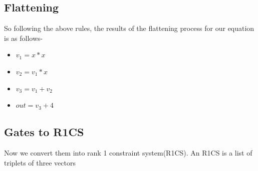 \documentclass[12pt,letterpaper]{article}
\begin{document}
\subsection{Flattening}
So following the above rules, the results of the flattening process for our equation is as follows-
\begin{itemize}
    \item  $v_1 = x*x$
    \item  $v_2 = v_1*x$
    \item  $v_3 = v_1 + v_2$
    \item  $out = v_3 + 4$
\end{itemize}
\subsection{Gates to R1CS}
Now we convert them into rank 1 constraint system(R1CS). An R1CS is a list of triplets of three vectors
\end{document}
